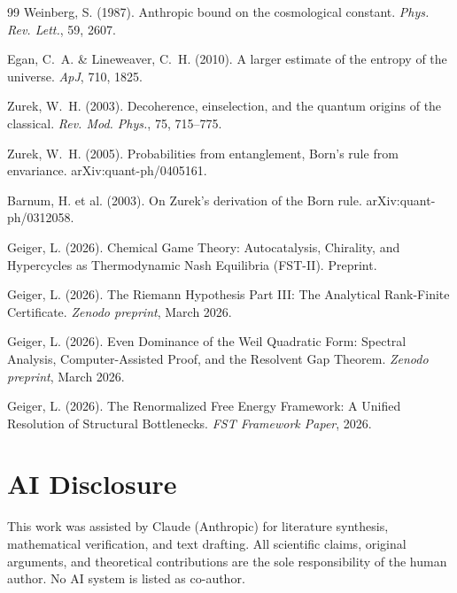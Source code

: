 \documentclass[12pt,a4paper]{article}
\theoremstyle{remark}
\begin{document}
\begin{thebibliography}{99}
Weinberg, S. (1987).
\newblock Anthropic bound on the cosmological constant.
\newblock \textit{Phys. Rev. Lett.}, 59, 2607.

Egan, C.~A. \& Lineweaver, C.~H. (2010).
\newblock A larger estimate of the entropy of the universe.
\newblock \textit{ApJ}, 710, 1825.

Zurek, W.~H. (2003).
\newblock Decoherence, einselection, and the quantum origins of the classical.
\newblock \textit{Rev. Mod. Phys.}, 75, 715--775.

Zurek, W.~H. (2005).
\newblock Probabilities from entanglement, Born's rule from envariance.
\newblock arXiv:quant-ph/0405161.

Barnum, H. et al. (2003).
\newblock On Zurek's derivation of the Born rule.
\newblock arXiv:quant-ph/0312058.

Geiger, L. (2026).
\newblock Chemical Game Theory: Autocatalysis, Chirality, and Hypercycles as Thermodynamic Nash Equilibria (FST-II).
\newblock Preprint.

Geiger, L. (2026).
\newblock The Riemann Hypothesis Part III: The Analytical Rank-Finite Certificate.
\newblock \textit{Zenodo preprint}, March 2026.

Geiger, L. (2026).
\newblock Even Dominance of the Weil Quadratic Form: Spectral Analysis, Computer-Assisted Proof, and the Resolvent Gap Theorem.
\newblock \textit{Zenodo preprint}, March 2026.

Geiger, L. (2026).
\newblock The Renormalized Free Energy Framework: A Unified Resolution of Structural Bottlenecks.
\newblock \textit{FST Framework Paper}, 2026.

\end{thebibliography}

\section*{AI Disclosure}
This work was assisted by Claude (Anthropic) for literature synthesis, mathematical verification, and text drafting. All scientific claims, original arguments, and theoretical contributions are the sole responsibility of the human author. No AI system is listed as co-author.
\end{document}
